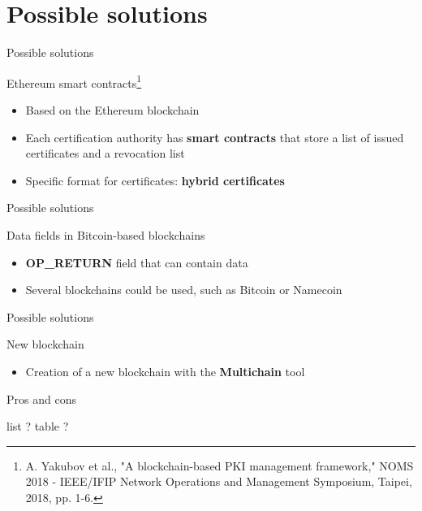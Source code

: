 \section[Possible solutions]{Possible solutions}


\begin{frame}{Possible solutions}

	\begin{exampleblock}{Ethereum smart contracts\footnote{A. Yakubov et al., "A blockchain-based PKI management framework," NOMS 2018 - IEEE/IFIP Network Operations and Management Symposium, Taipei, 2018, pp. 1-6.}}
		\begin{itemize}
			\item Based on the Ethereum blockchain
			\item Each certification authority has \textbf{smart contracts} that store a list of issued certificates and a revocation list
			\item Specific format for certificates: \textbf{hybrid certificates}
		\end{itemize}
	\end{exampleblock}

\end{frame}

\begin{frame}{Possible solutions}
	\begin{exampleblock}{Data fields in Bitcoin-based blockchains}
		\begin{itemize}
			\item \textbf{OP\_RETURN} field that can contain data
			\item Several blockchains could be used, such as Bitcoin or Namecoin
		\end{itemize}
	\end{exampleblock}
\end{frame}
	
\begin{frame}{Possible solutions}
	\begin{exampleblock}{New blockchain}
		\begin{itemize}
			\item Creation of a new blockchain with the \textbf{Multichain} tool
		\end{itemize}
	\end{exampleblock}
\end{frame}

\begin{frame}{Pros and cons}

list ? table ?
\end{frame}




